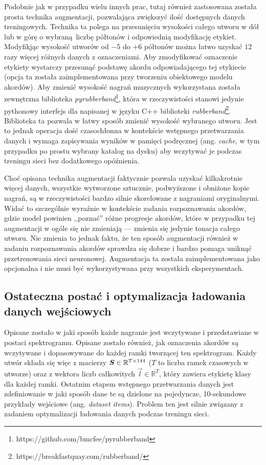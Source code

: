 Podobnie jak w przypadku wielu innych prac, tutaj również zastosowana została prosta technika
augmentacji, pozwalająca zwiększyć ilość dostępnych danych treningowych. Technika ta polega na
przesunięciu wysokości całego utworu w dół lub w górę o wybraną liczbę półtonów i odpowiednią
modyfikację etykiet. Modyfikjąc wysokość utworów od $-5$ do $+6$ półtonów można łatwo uzyskać $12$
razy więcej różnych danych z oznaczeniami. Aby zmodyfikować oznaczenie etykiety wystarczy przesunąć
podstawę akordu odpowiadającego tej etykiecie (opcja ta została zaimplementowana przy tworzeniu
obiektowego modelu akordów). Aby zmienić wysokość nagrań muzycznych wykorzystana została zewnętrzna
biblioteka \emph{pyrubberband}\footnote{https://github.com/bmcfee/pyrubberband}, która w
rzeczywistości stanowi jedynie pythonowy interfejs dla napisanej w języku C++ biblioteki
\emph{rubberband}\footnote{https://breakfastquay.com/rubberband/}. Biblioteka ta pozwala w łatwy
sposób zmienić wysokość wybranego utworu. Jest to jednak operacja dość czasochłonna w kontekście
wstępnego przetwarzania danych i wymaga zapisywania wyników w pamięci podręcznej (ang. \emph{cache},
w tym przypadku po prostu wybrany katalog na dysku) aby wczytywać je podczas treningu sieci bez
dodatkowego opóźnienia.

Choć opisana technika augmentacji faktycznie pozwala uzyskać kilkakrotnie więcej danych, wszystkie
wytworzone sztucznie, podwyższone i obniżone kopie nagrań, są w rzeczywistości bardzo silnie
skorelowane z nagraniami oryginalnymi. Widać to szczególnie wyraźnie w kontekście zadania
rozpoznawania akordów, gdzie model powinien ,,poznać'' różne progresje akordów, które w przypadku
tej augmentacji w ogóle się nie zmieniają --- zmienia się jedynie tonacja całego utworu. Nie zmienia
to jednak faktu, że ten sposób augmentacji również w zadaniu rozpoznawania akordów sprawdza się
dobrze i bardzo pomaga uniknąć przetrenowania sieci neuronowej. Augmentacja ta została
zaimplementowana jako opcjonalna i nie musi być wykorzystywana przy wszystkich eksperymentach.

\subsection{Ostateczna postać i optymalizacja ładowania danych wejściowych}

Opisane zostało w jaki sposób każde nagranie jest wczytywane i przedstawiane w postaci spektrogramu.
Opisane zostało również, jak oznaczenia akordów są wczytywane i dopasowywane do każdej ramki
tworzącej ten spektrogram. Każdy utwór składa się więc z macierzy $\boldsymbol{S} \in \mathbb{R}^{T \times 144}$ ($T$ to
liczba ramek czasowych w utworze) oraz z wektora liczb całkowitych $\vec l \in \mathbb{R}^T$, który
zawiera etykietę klasy dla każdej ramki. Ostatnim etapem wstępnego przetwarzania danych jest
zdefiniowanie w jaki sposób dane te są dzielone na pojedyncze, 10-sekundowe przykłady wejściowe
(ang. \emph{dataset items}). Problem ten jest silnie związany z zadaniem optymalizacji ładowania
danych podczas treningu sieci.

